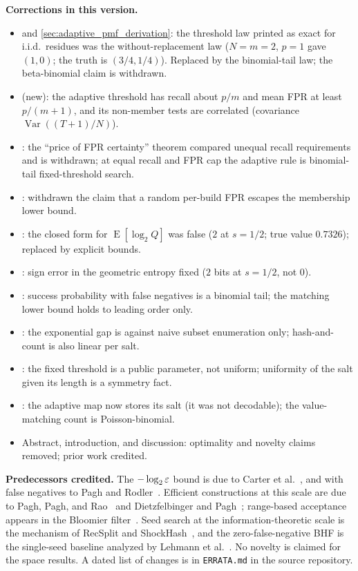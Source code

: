 \begin{center}
{\begin{minipage}{0.93\linewidth}
\textbf{Corrections in this version.}
\begin{itemize}\setlength{\itemsep}{1pt}\setlength{\parskip}{0pt}
\item {} and \cref{sec:adaptive_pmf_derivation}:
  the threshold law printed as exact for i.i.d.\ residues was the
  without-replacement law ($N=m=2$, $p=1$ gave $(1,0)$; the truth is
  $(3/4,1/4)$). Replaced by the binomial-tail law; the beta-binomial claim is
  withdrawn.
\item {} (new): the adaptive threshold has recall
  about $p/m$ and mean FPR at least $p/(m+1)$, and its non-member tests are
  correlated (covariance $\operatorname{Var}((T+1)/N)$).
\item {}: the ``price of FPR certainty'' theorem
  compared unequal recall requirements and is withdrawn; at equal recall and
  FPR cap the adaptive rule is binomial-tail fixed-threshold search.
\item {}: withdrawn the claim that a random per-build
  FPR escapes the membership lower bound.
\item {}: the closed form for $\operatorname{E}[\log_2 Q]$ was
  false ($2$ at $s=1/2$; true value $0.7326$); replaced by explicit bounds.
\item {}: sign error in the geometric entropy fixed
  ($2$ bits at $s=1/2$, not $0$).
\item {}: success probability with false negatives is a
  binomial tail; the matching lower bound holds to leading order only.
\item {}: the exponential gap is against naive subset
  enumeration only; hash-and-count is also linear per salt.
\item {}: the fixed threshold is a public parameter, not
  uniform; uniformity of the salt given its length is a symmetry fact.
\item {}: the adaptive map now stores its salt
  (it was not decodable); the value-matching count is Poisson-binomial.
\item Abstract, introduction, and discussion: optimality and novelty claims
  removed; prior work credited.
\end{itemize}

\textbf{Predecessors credited.} The $-\log_2\varepsilon$ bound is due to Carter
et al.~\cite{carter1978}, and with false negatives to Pagh and
Rodler~\cite{pagh2001lossy}. Efficient constructions at this scale are due to
Pagh, Pagh, and Rao~\cite{pagh2005} and Dietzfelbinger and
Pagh~\cite{dietzfelbinger2008retrieval}; range-based acceptance appears in the
Bloomier filter~\cite{chazelle2004bloomier}. Seed search at the
information-theoretic scale is the mechanism of RecSplit and
ShockHash~\cite{esposito2020recsplit,lehmann2024shockhash}, and the
zero-false-negative BHF is the single-seed baseline analyzed by Lehmann et
al.~\cite{lehmann2025seeds}. No novelty is claimed for the space results.
A dated list of changes is in \texttt{ERRATA.md} in the source repository.
\end{minipage}}
\end{center}
\endgroup
